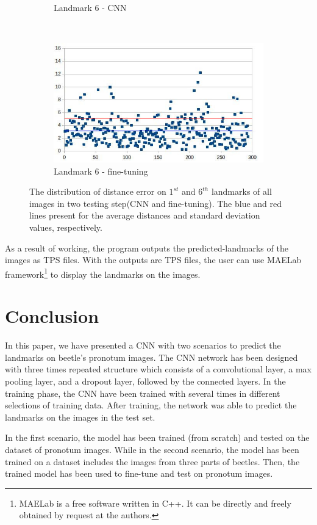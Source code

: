 \documentclass[10pt]{article}
\begin{document}
\begin{figure}[htbp]
\begin{subfigure}[t]{0.25\textwidth}
        \caption{\small{Landmark 6 - CNN}}
        \label{figsub111}
    \end{subfigure}%
    ~ 
    \begin{subfigure}[t]{0.25\textwidth}
        \centering
        \includegraphics[scale=.32]{images/lm6_finetuning_2}
        \caption{\small{Landmark 6 - fine-tuning}}
        \label{figsub222}
    \end{subfigure}
    \caption{\small{The distribution of distance error on $1^{st}$ and $6^{th}$ landmarks of all images in two testing step(CNN and fine-tuning). The blue and red lines present for the average distances and standard deviation values, respectively.}}
    \label{figrsexample2}
\end{figure}

As a result of working, the program outputs the
predicted-landmarks of the images as TPS files. With the outputs are TPS files,
the user can use MAELab framework\footnote{MAELab is a free software written in C++. It can be directly and freely
obtained by request at the authors.} to display the
landmarks on the images.
\section{Conclusion}
In this paper, we have presented a CNN with two scenarios to predict the landmarks on beetle's pronotum images. The CNN network has been designed with three times repeated structure which consists of a convolutional layer, a max pooling layer, and a dropout layer, followed by the connected layers. In the training phase, the CNN have been trained with several times in different selections of training data. After training, the network was able to predict the landmarks on the images in the test set. 

In the first scenario, the model has been trained (from scratch) and tested on the dataset of pronotum images. While in the second scenario, the model has been trained on a dataset includes the images from three parts of beetles. Then, the trained model has been used to fine-tune and test on pronotum images.
\end{document}
